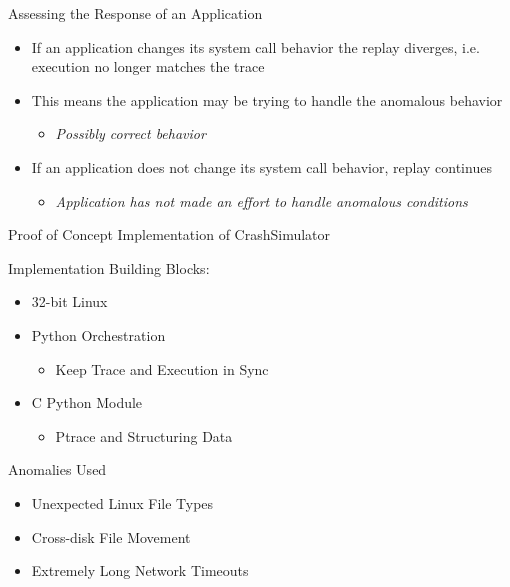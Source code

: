\documentclass[pdf]{beamer}
\begin{document}
\begin{frame}{Assessing the Response of an Application}
  \begin{itemize}
  \item{If an application changes its system call behavior the replay diverges,
      i.e. execution no longer matches the trace}
  \item{This means the application may be trying to handle the anomalous behavior}
    \begin{itemize}
    \item{\textit{Possibly correct behavior}}
    \end{itemize}
  \item{If an application does not change its system call behavior, replay
      continues}
    \begin{itemize}
    \item{\textit{Application has not made an effort to handle anomalous conditions}}
    \end{itemize}
  \end{itemize}
\end{frame}


\begin{frame}{Proof of Concept Implementation of CrashSimulator}

  Implementation Building Blocks:

  \begin{itemize}
  \item{32-bit Linux}
  \item{Python Orchestration}
    \begin{itemize}
    \item{Keep Trace and Execution in Sync}
    \end{itemize}
  \item{C Python Module}
    \begin{itemize}
    \item{Ptrace and Structuring Data}
    \end{itemize}
  \end{itemize}
\end{frame}


\begin{frame}{Anomalies Used}
  \begin{itemize}
  \item{Unexpected Linux File Types}
  \item{Cross-disk File Movement}
  \item{Extremely Long Network Timeouts}
  \end{itemize}
\end{frame}
\end{document}
